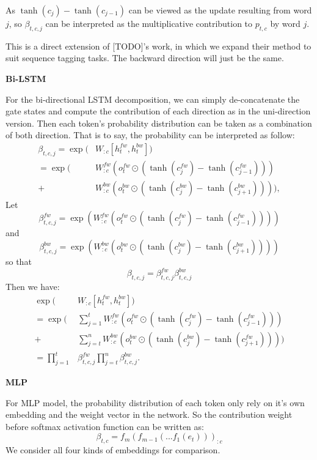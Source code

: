 \documentclass{article}
\begin{document}
As $\tanh(c_j) - \tanh(c_{j-1})$ can be viewed as the update resulting from word $j$, so $\beta_{t, c, j}$ can be interpreted as the multiplicative contribution to $p_{t, c}$ by word $j$. 

This is a direct extension of [TODO]'s work, in which we expand their method to suit sequence tagging tasks.
The backward direction will just be the same.

\textbf{Bi-LSTM}

For the bi-directional LSTM decomposition, we can simply de-concatenate the gate states and compute the contribution of each direction as in the uni-direction version. Then each token's probability distribution can be taken as a combination of both direction. That is to say, the probability can be interpreted as follow:
\begin{align}\label{eq:bi-beta} 
\beta_{t, c, j} = \exp(&W_{:c} [h_t^{fw}, h_t^{bw}])\\
= \exp(&W_{:c}^{fw} (o_t^{fw} \odot (\tanh(c_j^{fw})- \tanh(c_{j-1}^{fw}))) \\
+ &W_{:c}^{bw} (o_t^{bw} \odot (\tanh(c_j^{bw})- \tanh(c_{j+1}^{bw})))),
\end{align}
Let
\begin{equation}
\beta_{t, c, j}^{fw} = \exp(W_{:c}^{fw} (o_t^{fw} \odot (\tanh(c_j^{fw})- \tanh(c_{j-1}^{fw}))))
\end{equation}
and
\begin{equation}
\beta_{t, c, j}^{bw} = \exp(W_{:c}^{bw} (o_t^{bw} \odot (\tanh(c_j^{bw})- \tanh(c_{j+1}^{bw}))))
\end{equation}
so that 
\begin{equation}
\beta_{t, c, j} = \beta_{t, c, j}^{fw} \beta_{t, c, j}^{bw}
\end{equation}
Then we have:
\begin{align}
	\exp(&W_{:c} [h_t^{fw}, h_t^{bw}]) \\
= \exp(&\sum_{j=1}^t W_{:c}^{fw} (o_t^{fw} \odot (\tanh(c_j^{fw}) - \tanh(c_{j-1}^{fw})))\\
	+&\sum_{j=t}^n W_{:c}^{bw} (o_t^{bw} \odot (\tanh(c_j^{bw}) - \tanh(c_{j+1}^{fw}))))\\
= \prod_{j=1}^t &\beta_{t, c, j}^{fw} \prod_{j=t}^n \beta_{t, c, j}^{bw}.
\end{align}

\textbf{MLP}

For MLP model, the probability distribution of each token only rely on it's own embedding and the weight vector in the network. So the contribution weight before softmax activation function can be written as: 
\begin{equation}
\beta_{t, c} = f_m(f_{m-1}(...f_1(e_t)))_{:c}
\end{equation} 
We consider all four kinds of embeddings for comparison.
\end{document}
